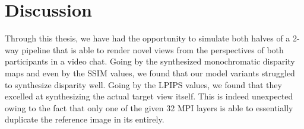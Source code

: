\chapter{Discussion}\label{ch:discussion}





Through this thesis, we have had the opportunity to simulate both halves of a 2-way pipeline that is able to render novel views from the perspectives of both participants in a video chat. Going by the synthesized monochromatic disparity maps and even by the SSIM values, we found that our model variants struggled to synthesize disparity well. Going by the LPIPS values, we found that they excelled at synthesizing the actual target view itself. This is indeed unexpected owing to the fact that only one of the given 32 MPI layers is able to essentially duplicate the reference image in its entirely.

